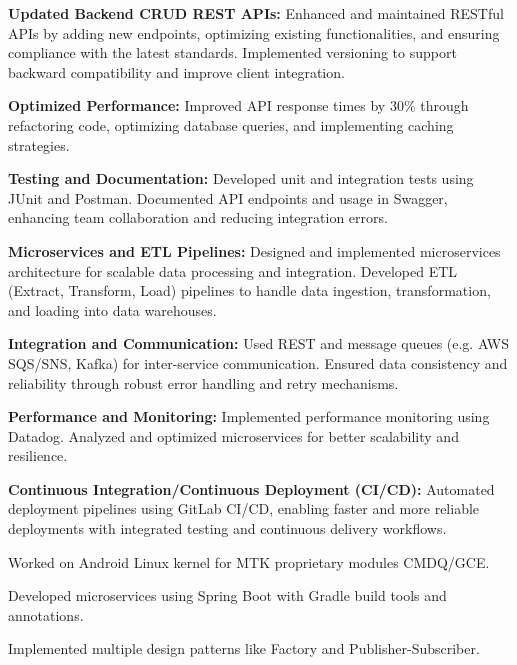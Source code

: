 \documentclass[]{deedy-resume-openfont}
\begin{document}
\begin{minipage}[t]{0.66\textwidth}
\begin{tightemize}
            \item \textbf{Updated Backend CRUD REST APIs:} Enhanced and maintained RESTful APIs by adding new endpoints, optimizing existing functionalities, and ensuring compliance with the latest standards. Implemented versioning to support backward compatibility and improve client integration.
            \item \textbf{Optimized Performance:} Improved API response times by 30\% through refactoring code, optimizing database queries, and implementing caching strategies.
            \item \textbf{Testing and Documentation:} Developed unit and integration tests using JUnit and Postman. Documented API endpoints and usage in Swagger, enhancing team collaboration and reducing integration errors.
            \newline
            \newline
            \item \textbf{Microservices and ETL Pipelines:} Designed and implemented microservices architecture for scalable data processing and integration. Developed ETL (Extract, Transform, Load) pipelines to handle data ingestion, transformation, and loading into data warehouses.
            \item \textbf{Integration and Communication:} Used REST and message queues (e.g. AWS SQS/SNS, Kafka) for inter-service communication. Ensured data consistency and reliability through robust error handling and retry mechanisms.
            \item \textbf{Performance and Monitoring:} Implemented performance monitoring using Datadog. Analyzed and optimized microservices for better scalability and resilience.
            \item \textbf{Continuous Integration/Continuous Deployment (CI/CD):} Automated deployment pipelines using GitLab CI/CD, enabling faster and more reliable deployments with integrated testing and continuous delivery workflows.
        \end{tightemize}
        \sectionsep

        \vspace{\topsep} %
        \begin{tightemize}
            \item Worked on Android Linux kernel for MTK proprietary modules CMDQ/GCE.
            \item Developed microservices using Spring Boot with Gradle build tools and annotations.
            \item Implemented multiple design patterns like Factory and Publisher-Subscriber.
        \end{tightemize}
        \sectionsep


\end{minipage}
\end{document}
